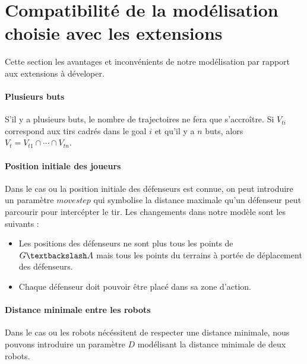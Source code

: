 \documentclass[12pt]{article}
\begin{document}



\section{Compatibilité de la modélisation choisie avec les extensions}

Cette section les avantages et inconvénients de notre modélisation par rapport aux extensions à déveloper.

\paragraph{Plusieurs buts}
S'il y a plusieurs buts, le nombre de trajectoires ne fera que s'accroître. Si $V_{ti}$ correspond aux tirs cadrés dans le goal $i$ et qu'il y a $n$ buts, alors $V_t = V_{t1} \cap \cdots \cap V_{tn}$.


\paragraph{Position initiale des joueurs}
Dans le cas ou la position initiale des défenseurs est connue, on peut introduire un paramètre $movestep$ qui symbolise la distance maximale qu'un défenseur peut parcourir pour intercépter le tir. Les changements dans notre modèle sont les suivants :

\begin{itemize}
  \item Les positions des défenseurs ne sont plus tous les points de $G \textbackslash A$ mais tous les points du terrains à portée de déplacement des défenseurs.
  \item Chaque défenseur doit pouvoir être placé dans sa zone d'action.
\end{itemize}

\paragraph{Distance minimale entre les robots}
Dans le cas ou les robots nécéssitent de respecter une distance minimale, nous pouvons introduire un paramètre $D$ modélisant la distance minimale de deux robots.
\end{document}
